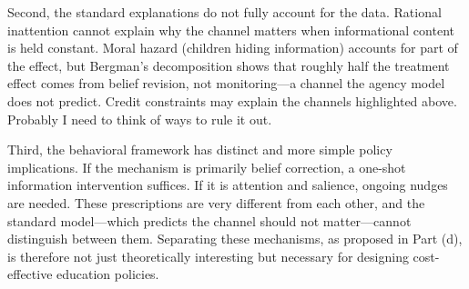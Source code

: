 \documentclass[11pt]{article}
\begin{document}
Second, the standard explanations do not fully account for the data. Rational inattention cannot explain why the channel matters when informational content is held constant. Moral hazard (children hiding information) accounts for part of the effect, but Bergman's decomposition shows that roughly half the treatment effect comes from belief revision, not monitoring---a channel the agency model does not predict. Credit constraints may explain the channels highlighted above. Probably I need to think of ways to rule it out.

Third, the behavioral framework has distinct and more simple policy implications. If the mechanism is primarily belief correction, a one-shot information intervention suffices. If it is attention and salience, ongoing nudges are needed. These prescriptions are very different from each other, and the standard model---which predicts the channel should not matter---cannot distinguish between them. Separating these mechanisms, as proposed in Part (d), is therefore not just theoretically interesting but necessary for designing cost-effective education policies.




\end{document}
